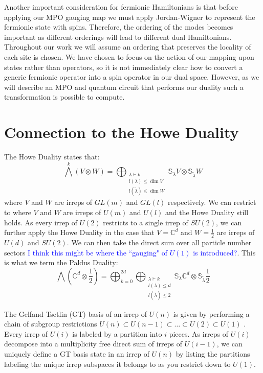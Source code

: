 \documentclass[aps,prx,twocolumn,floatfix,10pt,amssymb,amsfont,amsmath,superscriptaddress,float,nofootinbib,longbibliography,nobalancelastpage]{revtex4-2}
\begin{document}
Another important consideration for fermionic Hamiltonians is that before applying our MPO gauging map we must apply Jordan-Wigner to represent the fermionic state with spins. Therefore, the ordering of the modes becomes important as different orderings will lead to different dual Hamiltonians. Throughout our work we will assume an ordering that preserves the locality of each site is chosen. We have chosen to focus on the action of our mapping upon states rather than operators, so it is not immediately clear how to convert a generic fermionic operator into a spin operator in our dual space. However, as we will describe an MPO and quantum circuit that performs our duality such a transformation is possible to compute.
\section{Connection to the Howe Duality}

The Howe Duality states that:
\begin{equation}
    \bigwedge^k(V\otimes W) = \bigoplus_{\substack{\lambda \vdash k\\l(\lambda
    ) \leq \dim V\\l(\tilde \lambda
    ) \leq \dim W}}\mathbb{S
}_{\lambda}V\otimes \mathbb{S
}_{\tilde \lambda}W
\end{equation}
where $V$ and $W$ are irreps of $GL(m)$ and $GL(l)$ respectively. We can restrict to where $V$ and $W$ are irreps of $U(m)$ and $U(l)$ and the Howe Duality still holds. As every irrep of $U(2)$ restricts to a single irrep of $SU(2)$, we can further apply the Howe Duality in the case that $V = \mathbb{C}^d$ and $W=\frac{1}{2}$ are irreps of $U(d)$ and $SU(2)$. We can then take the direct sum over all particle number sectors \textcolor{blue}{I think this might be where the ``gauging" of $U(1)$ is introduced?}. This is what we term the Paldus Duality:
\begin{equation}
    \bigwedge(\mathbb{C}^d\otimes \frac{1}{2}) = \bigoplus_{k=0}^{2d}\bigoplus_{\substack{\lambda \vdash k\\l(\lambda
    ) \leq d\\l(\tilde \lambda
    ) \leq 2}}\mathbb{S
}_{\lambda}\mathbb{C}^d\otimes \mathbb{S
}_{\tilde \lambda}\frac{1}{2}
\end{equation}

The Gelfand-Tsetlin (GT) basis of an irrep of $U(n)$ is given by performing a chain of subgroup restrictions $U(n) \subset U(n-1) \subset \ldots \subset U(2) \subset U(1)$ \cite{paldus1976many}. Every irrep of $U(i)$ is labeled by a partition into $i$ pieces. As irreps of $U(i)$ decompose into a multiplicity free direct sum of irreps of $U(i-1)$, we can uniquely define a GT basis state in an irrep of $U(n)$ by listing the partitions labeling the unique irrep subspaces it belongs to as you restrict down to $U(1)$. 
\end{document}
